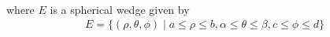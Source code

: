 \documentclass[10pt]{article}
\begin{document}
\begin{multicols*}{2}
\begin{enumerate}
\begin{enumerate}
\begin{align*}
        \end{align*}
        where $E$ is a spherical wedge given by 
        \begin{align*}
            E = \{ (\rho, \theta, \phi) \mid a \leq \rho \leq b, \alpha \leq \theta \leq \beta, c \leq \phi \leq d \}
        \end{align*}
    \end{enumerate}
    

\end{enumerate}
\end{multicols*}
\end{document}
